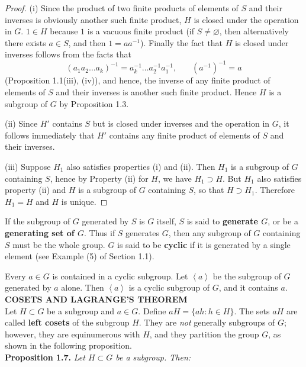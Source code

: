 \documentclass[leqno]{book}
\begin{document}
\begin{proof}
(i) Since the product of two finite products of elements of $S$ and their inverses is obviously another such finite product, $H$ is closed under the operation in $G$.  $1\in H$ because $1$ is a vacuous finite product (if $S\ne\varnothing$, then alternatively there exists $a\in S$, and then $1=aa^{-1}$).  Finally the fact that $H$ is closed under inverses follows from the facts that
$$(a_1a_2\dots a_k)^{-1}=a_k^{-1}\dots a_2^{-1}a_1^{-1},~~~~~~~~(a^{-1})^{-1}=a$$
(Proposition 1.1(iii), (iv)), and hence, the inverse of any finite product of elements of $S$ and their inverses is another such finite product.  Hence $H$ is a subgroup of $G$ by Proposition 1.3.

(ii) Since $H'$ contains $S$ but is closed under inverses and the operation in $G$, it follows immediately that $H'$ contains any finite product of elements of $S$ and their inverses.

(iii) Suppose $H_1$ also satisfies properties (i) and (ii).  Then $H_1$ is a subgroup of $G$ containing $S$, hence by Property (ii) for $H$, we have $H_1\supset H$.  But $H_1$ also satisfies property (ii) and $H$ is a subgroup of $G$ containing $S$, so that $H\supset H_1$.  Therefore $H_1=H$ and $H$ is unique.
\end{proof}

\noindent If the subgroup of $G$ generated by $S$ is $G$ itself, $S$ is said to \textbf{generate $G$}, or be a \textbf{generating set of $G$}.  Thus if $S$ generates $G$, then any subgroup of $G$ containing $S$ must be the whole group.  $G$ is said to be \textbf{cyclic} if it is generated by a single element (see Example (5) of Section 1.1).

Every $a\in G$ is contained in a cyclic subgroup.  Let $\left<a\right>$ be the subgroup of $G$ generated by $a$ alone.  Then $\left<a\right>$ is a cyclic subgroup of $G$, and it contains $a$.\\

\noindent\textbf{COSETS AND LAGRANGE'S THEOREM}\\

\noindent Let $H\subset G$ be a subgroup and $a\in G$.  Define $aH=\{ah:h\in H\}$.  The sets $aH$ are called \textbf{left cosets} of the subgroup $H$.  They are \emph{not} generally subgroups of $G$; however, they are equinumerous with $H$, and they partition the group $G$, as shown in the following proposition.\\

\noindent\textbf{Proposition 1.7.} \emph{Let $H\subset G$ be a subgroup.  Then:} %
\end{document}
